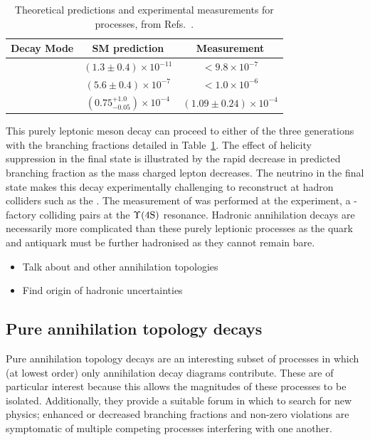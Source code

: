 \begin{table}[h]
   \begin{center}
      \begin{tabular}{lcc}
         \hline

         Decay Mode                 & SM prediction & Measurement \\
         \hline 
         \decay{\Bp}{\ep\neue}      & $(1.3\pm0.4)\times10^{-11}$           & $<9.8\times10^{-7}$\\
         \decay{\Bp}{\mup\neum}     & $(5.6\pm0.4)\times10^{-7}$            & $<1.0\times10^{-6}$\\
         \decay{\Bp}{\taup\neut}    & $(0.75^{+1.0}_{-0.05} )\times 10^{-4}$& $(1.09\pm0.24)\times 10^{-4}$ \\

         \hline
      \end{tabular}
   \end{center}
   \caption{Theoretical predictions and experimental measurements for \decay{\Bp}{\ellp\neul} processes, from Refs.~\cite{PhysRevD.92.051102,PhysRevD.79.091101,SATOYAMA200767}.}
   \label{tab:Theory_B2ellnu}
\end{table}
This purely leptonic \Bp meson decay can proceed to either of the three generations with the branching fractions detailed in Table~\ref{tab:Theory_B2ellnu}. The effect of helicity suppression in the final state is illustrated by the rapid decrease in predicted branching fraction as the mass charged lepton decreases. The neutrino in the final state makes this decay experimentally challenging to reconstruct at hadron colliders such as the \lhc. The measurement of \decay{\Bp}{\taup\neut} was performed at the \belle experiment, a \B-factory colliding \ep\en pairs at the $\Upsilon(\text{4S})$ resonance. 
Hadronic annihilation decays are necessarily more complicated than these purely leptionic processes as the quark and antiquark must be further hadronised as they cannot remain bare.


{\color{Red}
\begin{itemize}
\item Talk about \D and other annihilation topologies 
\item Find origin of hadronic uncertainties 
\end{itemize}}


\subsection{Pure annihilation topology decays}
Pure annihilation topology decays are an interesting subset of processes in which (at lowest order) only annihilation decay diagrams contribute. These are of particular interest because this allows the magnitudes of these processes to be isolated. Additionally, they provide a suitable forum in which to search for new physics; enhanced or decreased branching fractions and non-zero \CP violations are symptomatic of multiple competing processes interfering with one another.  

